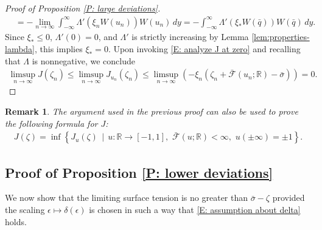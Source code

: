 \documentclass[12pt]{amsart}
\newtheorem{remark}{Remark}
\begin{document}
\begin{proof}[Proof of Proposition \ref{P: large deviations}]
\begin{align*}
		&= - \lim_{ n \to \infty } \int_{-\infty}^{\infty} \Lambda'(\xi_{n} W(u_{n}) ) W(u_{n}) \, dy = - \int_{-\infty}^{\infty} \Lambda'(\xi_{*} W(\bar{q}) ) W(\bar{q}) \, dy.
	\end{align*}
Since $\xi_{*} \leq 0$, $\Lambda'(0) = 0$, and $\Lambda'$ is strictly increasing by Lemma \ref{lem:properties-lambda}, this implies $\xi_{*} = 0$.  Upon invoking \eqref{E: analyze J at zero} and recalling that $\Lambda$ is nonnegative, we conclude
	\begin{align*}
		\limsup_{n \to \infty} J(\zeta_{n}) \leq \limsup_{n \to \infty} J_{u_{n}}(\zeta_{n}) \leq \limsup_{n \to \infty} \left( - \xi_{n} ( \zeta_{n} + \bar{\mathscr{F}}(u_{n};\mathbb{R}) - \bar{\sigma} ) \right) = 0.
	\end{align*}
       \end{proof}  

\begin{remark} The argument used in the previous proof can also be used to prove the following formula for $J$:
	\begin{align*}
		J(\zeta) = \inf \left\{ J_{u}(\zeta) \, \mid \, u : \mathbb{R} \to [-1,1], \, \, \bar{\mathscr{F}}(u;\mathbb{R}) < \infty, \, \, u(\pm \infty) = \pm 1 \right\}.
	\end{align*}\end{remark}
        
\subsection{Proof of Proposition \ref{P: lower deviations}} We now show that the limiting surface tension is no greater than $\bar{\sigma} - \zeta$ provided the scaling $\epsilon \mapsto \delta(\epsilon)$ is chosen in such a way that \eqref{E: assumption about delta} holds. 
	
\end{document}
